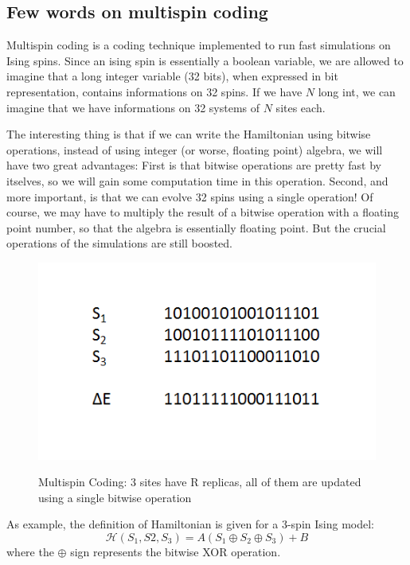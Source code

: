 \documentclass{article}
\begin{document}
\subsection{Few words on multispin coding}

Multispin coding is a coding technique implemented to run fast simulations on
Ising spins. Since an ising spin is essentially a boolean variable, we are
allowed to imagine that a long integer variable (32 bits), when expressed in
bit representation, contains informations on 32 spins. If we have $N$ long
int, we can imagine that we have informations on 32 systems of $N$ sites each.

The interesting thing is that if we can write the Hamiltonian using bitwise
operations, instead of using integer (or worse, floating point) algebra, we
will have two great advantages: First is that bitwise operations are pretty
fast by itselves, so we will gain some computation time in this operation.
Second, and more important, is that we can evolve 32 spins using a single
operation! Of course, we may have to multiply the result of a bitwise
operation with a floating point number, so that the algebra is essentially
floating point. But the crucial operations of the simulations are still
boosted.


\begin{figure}[h]
		\includegraphics{img_multispin.png}
	\label{fig:img_multispin}
	\caption{Multispin Coding: 3 sites have R replicas, all of them are updated using a single bitwise operation}

\end{figure}

As example, the definition of Hamiltonian is given for a 3-spin Ising model:
\begin{equation}
  \mathcal{H} (S_1, S 2, S_3) = A (S_1 \oplus S_2 \oplus S_3) + B
\end{equation}
where the $\oplus$ sign represents the bitwise XOR operation.
\end{document}

